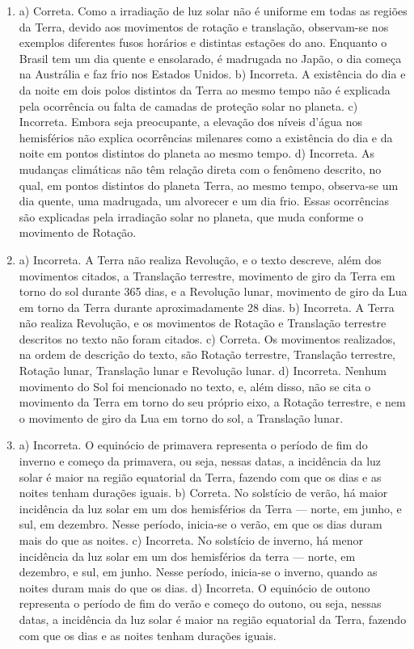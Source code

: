 
\begin{enumerate}
\item
a) Correta. Como a irradiação de luz solar não é uniforme em todas as
regiões da Terra, devido aos movimentos de rotação e translação,
observam-se nos exemplos diferentes fusos horários e distintas estações do
ano. Enquanto o Brasil tem um dia quente e ensolarado, é madrugada 
no Japão, o dia começa na Austrália e faz frio nos Estados Unidos.
b) Incorreta. A existência do dia e da noite em dois polos distintos da
Terra ao mesmo tempo não é explicada pela ocorrência ou falta de camadas
de proteção solar no planeta.
c) Incorreta. Embora seja preocupante, a elevação dos níveis d'água nos
hemisférios não explica ocorrências milenares como a existência do dia
e da noite em pontos distintos do planeta ao mesmo tempo.
d) Incorreta. As mudanças climáticas não têm relação direta com o
fenômeno descrito, no qual, em pontos distintos do planeta Terra, ao mesmo
tempo, observa-se um dia quente, uma madrugada, um alvorecer e um dia
frio. Essas ocorrências são explicadas pela irradiação solar no planeta,
que muda conforme o movimento de Rotação.

\item
a) Incorreta. A Terra não realiza Revolução, e o texto descreve, além
dos movimentos citados, a Translação terrestre, movimento de giro da
Terra em torno do sol durante 365 dias, e a Revolução lunar, movimento
de giro da Lua em torno da Terra durante aproximadamente 28 dias.
b) Incorreta. A Terra não realiza Revolução, e os movimentos de Rotação
e Translação terrestre descritos no texto não foram citados.
c) Correta. Os movimentos realizados, na ordem de descrição do texto,
são Rotação terrestre, Translação terrestre, Rotação lunar, Translação
lunar e Revolução lunar.
d) Incorreta. Nenhum movimento do Sol foi mencionado no texto, e, além
disso, não se cita o movimento da Terra em torno do seu próprio eixo, a
Rotação terrestre, e nem o movimento de giro da Lua em torno do sol, a
Translação lunar.

\item
a) Incorreta. O equinócio de primavera representa o período de fim do
inverno e começo da primavera, ou seja, nessas datas, a incidência da
luz solar é maior na região equatorial da Terra, fazendo com que os dias
e as noites tenham durações iguais.
b) Correta. No solstício de verão, há maior incidência da luz solar em
um dos hemisférios da Terra --- norte, em junho, e sul, em dezembro.
Nesse período, inicia-se o verão, em que os dias duram mais do que as
noites.
c) Incorreta. No solstício de inverno, há menor incidência da luz solar
em um dos hemisférios da terra --- norte, em dezembro, e sul, em junho.
Nesse período, inicia-se o inverno, quando as noites duram mais do que
os dias.
d) Incorreta. O equinócio de outono representa o período de fim do verão
e começo do outono, ou seja, nessas datas, a incidência da luz solar é
maior na região equatorial da Terra, fazendo com que os dias e as noites
tenham durações iguais.
\end{enumerate}


